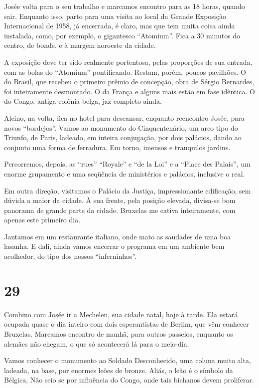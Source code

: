 Josée volta para o seu trabalho e marcamos encontro para as 18 horas, quando sair. Enquanto isso, parto para uma visita ao local da Grande Exposição Internacional de 1958, já encerrada, é claro, mas que tem muita coisa ainda instalada, como, por exemplo, o gigantesco ``Atomium''. Fica a 30 minutos do centro, de bonde, e à margem noroeste da cidade.

A exposição deve ter sido realmente portentosa, pelas proporções de sua entrada, com as bolas do ``Atomium'' pontificando. Restam, porém, poucos pavilhões. O do Brasil, que recebeu o primeiro prêmio de concepção, obra de Sérgio Bernardes, foi inteiramente desmontado. O da França e alguns mais estão em fase idêntica. O do Congo, antiga colônia belga, jaz completo ainda.

Alcino, na volta, fica no hotel para descansar, enquanto reencontro Josée, para novos ``bordejos''. Vamos ao monumento do Cinquentenário, um arco tipo do Triunfo, de Paris, ladeado, em inteira conjugação, por dois palácios, dando ao conjunto uma forma de ferradura. Em torno, imensos e tranquilos jardins.

Percorremos, depois, as ``rues'' ``Royale'' e ``de la Loi'' e a ``Place des Palais'', um enorme grupamento e uma seqüência de ministérios e palácios, inclusive o real.

Em outra direção, visitamos o Palácio da Justiça, impressionante edificação, sem dúvida a maior da cidade. À sua frente, pela posição elevada, divisa-se bom panorama de grande parte da cidade. Bruxelas me cativa inteiramente, com apenas este primeiro dia.

Jantamos em um restaurante italiano, onde mato as saudades de uma boa lasanha. E dali, ainda vamos encerrar o programa em um ambiente bem acolhedor, do tipo dos nossos ``inferninhos''.

\section*{29 \adfflatleafright {}}
Combino com Josée ir a Mechelen, sua cidade natal, hoje à tarde. Ela estará ocupada quase o dia inteiro com dois esperantistas de Berlim, que vêm conhecer Bruxelas. Marcamos encontro de manhã, para outros passeios, enquanto os alemães não chegam, o que só acontecerá lá para o meio-dia.

Vamos conhecer o monumento ao Soldado Desconhecido, uma coluna muito alta, ladeada, na base, por enormes leões de bronze. Aliás, o leão é o símbolo da Bélgica, Não seio se por influência do Congo, onde tais bichanos devem proliferar.

